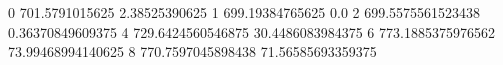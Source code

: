 0 701.5791015625 2.38525390625
1 699.19384765625 0.0
2 699.5575561523438 0.36370849609375
4 729.6424560546875 30.4486083984375
6 773.1885375976562 73.99468994140625
8 770.7597045898438 71.56585693359375
